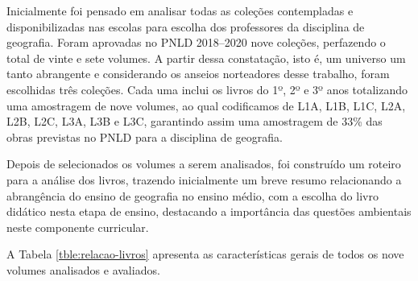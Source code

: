 \begin{refsection}
    Inicialmente foi pensado em analisar todas as coleções contempladas e disponibilizadas nas escolas para escolha dos professores da disciplina de geografia. Foram aprovadas no PNLD 2018--2020 nove coleções, perfazendo o total de vinte e sete volumes. A partir dessa constatação, isto é, um universo um tanto abrangente e considerando os anseios norteadores desse trabalho, foram escolhidas três coleções. Cada uma inclui os livros do 1º, 2º e 3º anos totalizando uma amostragem de nove volumes, ao qual codificamos de L1A, L1B, L1C, L2A, L2B, L2C, L3A, L3B e L3C, garantindo assim uma amostragem de 33\% das obras previstas no PNLD para a disciplina de geografia.  

    Depois de selecionados os volumes a serem analisados, foi construído um roteiro para a análise dos livros, trazendo inicialmente um breve resumo relacionando a abrangência do ensino de geografia no ensino médio, com a escolha do livro didático nesta etapa de ensino, destacando a importância das questões ambientais neste componente curricular.  

    A Tabela \ref{tble:relacao-livros} apresenta as características gerais de todos os nove volumes analisados e avaliados.

    \begin{table}
        \centering

        \caption{Relação das coleções dos livros didáticos de Geografia para a avaliação para o triênio 2018--2020, do Programa do Livro Didático (PNLD)}
        \label{tble:relacao-livros}

\end{table}
\end{refsection}
